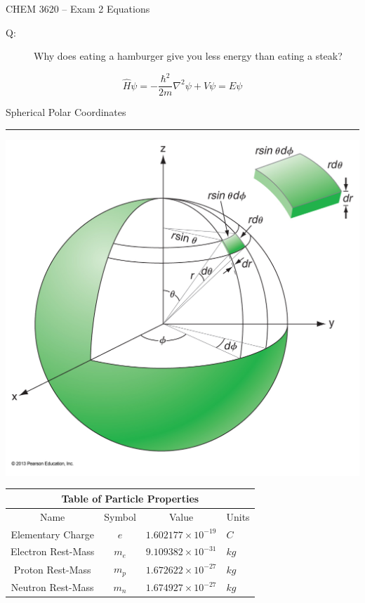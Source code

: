 \documentclass[12pt, letterpaper]{memoir}
\begin{document}
	\mainmatter
	
	\begin{center}
		{\Huge CHEM 3620}
		{\LARGE-- Exam 2 Equations}
		\begin{description}
			\item[Q:] Why does eating a hamburger give you less energy than eating a steak?
		\end{description}
	
		
		\begin{center}
			\begin{equation*}
				\hat{H}\psi = -\dfrac{\hbar^2}{2m}\nabla^2\psi + V\psi = E\psi
			\end{equation*}
		
		
			\begin{minipage}[c]{0.7\textwidth}
				\begin{mdframed}
					\centering
					Spherical Polar Coordinates
					\hrule
					\includegraphics[width = \textwidth]{02_05_Figure}
				\end{mdframed}
			\end{minipage}
		\end{center}

	
		
		\begin{tabular}{ccrl}
			\multicolumn{4}{c}{Table of Particle Properties}\\
			\toprule
			Name&Symbol&\multicolumn{1}{c}{Value}&\multicolumn{1}{c}{Units}\\
			\midrule
			\midrule
			Elementary Charge		& $e$		& $1.602177\times10^{-19}$	& $C$\\
			\midrule
			Electron Rest-Mass		& $m_e$		& $9.109382\times10^{-31}$	& $kg$\\
			\midrule
			Proton Rest-Mass		& $m_p$		& $1.672622\times10^{-27}$	& $kg$\\
			\midrule
			Neutron Rest-Mass		& $m_n$		& $1.674927\times10^{-27}$	& $kg$\\
			\bottomrule
		\end{tabular}


\end{center}
\end{document}
